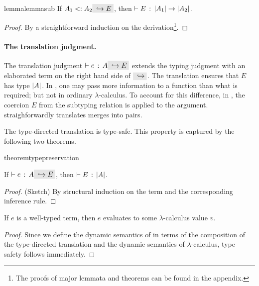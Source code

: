 

\begin{restatable}{lemma}{lemmasub}
  \label{lemma:sub}
  If $ A_1 \subtype A_2 \yields E $, then $ \vdash E \ \!:\! \ \lvert A_1 \rvert \to \lvert A_2 \rvert $.
\end{restatable}

\begin{proof}
  By a straightforward induction on the derivation\footnote{The proofs of major lemmata and theorems can be found in the appendix.}.
\end{proof}

\paragraph{The translation judgment.} The translation judgment $\jtype \Gamma e
A \yields E$ extends the typing judgment with an elaborated term on the right
hand side of $\yields {}$. The translation ensures that $E$ has type $\lvert A \rvert$. In
\name, one may pass more information to a function than what is required; but
not in ordinary $\lambda$-calculus. To account for this difference, in , the
coercion $E$ from the subtyping relation is applied to the argument.
 straighforwardly translates merges into pairs.

The type-directed translation is type-safe. This property is captured
by the following two theorems.

\begin{restatable}{theorem}{typepreservation}
  \label{theorem:type-preservation}

  If $ \jtype \Gamma e A \yields E $,
  then $ \vdash E \ \!:\! \ \lvert A \rvert $.
\end{restatable}

\begin{proof}
  (Sketch) By structural induction on the term and the corresponding
  inference rule.
\end{proof}

\begin{theorem}
  If $e$ is a well-typed \name term, then $e$ evaluates to some $\lambda$-calculus
  value $v$.
\end{theorem}

\begin{proof}
  Since we define the dynamic semantics of \name in terms of the composition of
  the type-directed translation and the dynamic semantics of $\lambda$-calculus, type safety follows immediately.
\end{proof}
